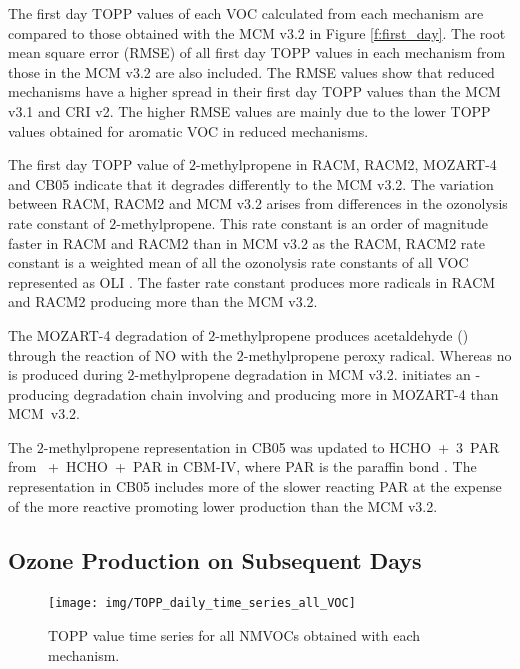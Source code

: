 The first day TOPP values of each VOC calculated from each mechanism are compared to those obtained with the MCM v3.{2} in Figure \ref{f:first_day}.
The root mean square error (RMSE) of all first day TOPP values in each mechanism from those in the MCM v3.2 are also included.
The RMSE values show that reduced mechanisms have a higher spread in their first day TOPP values than the MCM v3.1 and CRI v2.
The higher RMSE values are mainly due to the lower TOPP values obtained for aromatic VOC in reduced mechanisms.

The first day TOPP value of $2$-methylpropene in RACM, RACM2, MOZART-4 and CB05 indicate that it degrades differently to the MCM v3.2. 
The variation between RACM, RACM2 and MCM v3.2 arises from differences in the ozonolysis rate constant of $2$-methylpropene.
This rate constant is an order of magnitude faster in RACM and RACM2 than in MCM v3.2 as the RACM, RACM2 rate constant is a weighted mean of all the ozonolysis rate constants of all VOC represented as OLI \citep{Stockwell:1997, Goliff:2013}.
The faster rate constant produces more radicals in RACM and RACM2 producing more  than the MCM v3.2.

The MOZART-4 degradation of $2$-methylpropene produces acetaldehyde () through the reaction of NO with the $2$-methylpropene peroxy radical.
Whereas no  is produced during $2$-methylpropene degradation in MCM v3.2.
 initiates an -producing degradation chain involving  and  producing more  in MOZART-4 than \mbox{MCM v3.2}.

The $2$-methylpropene representation in CB05 was updated to \mbox{HCHO + $3$ PAR} from \mbox{ + HCHO + PAR} in CBM-IV, where PAR is the paraffin  bond \citep{Gery:1989, Yarwood:2005}.
The representation in CB05 includes more of the slower reacting PAR at the expense of the more reactive  promoting lower  production than the MCM v3.2.

\subsection{Ozone Production on Subsequent Days} \label{ss:profiles} %

\begin{figure}
    \centering
    \texttt{[image: img/TOPP\_daily\_time\_series\_all\_VOC]}
    \vspace{0mm}
    \caption{TOPP value time series for all NMVOCs obtained with each mechanism.}
    \vspace{-4mm}
    \label{f:TOPP_dailies}
\end{figure}

